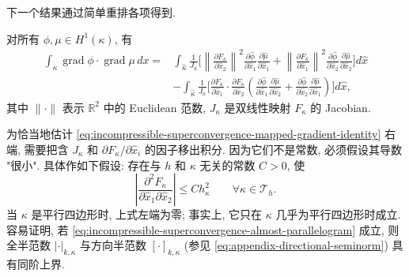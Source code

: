 下一个结果通过简单重排各项得到.

\begin{Lemma}\label{lem:incompressible-superconvergence-mapped-gradient-identity}
对所有 $\phi,\mu\in H^1(\kappa)$, 有
\begin{equation}\label{eq:incompressible-superconvergence-mapped-gradient-identity}
\begin{split}
\int_\kappa\operatorname{grad}\phi\cdot
\operatorname{grad}\mu\,dx
={}&\int_{\widehat\kappa}\frac1{J_\kappa}
\biggl[
\left\|\frac{\partial F_\kappa}{\partial\widehat x_2}\right\|^2
\frac{\partial\widehat\phi}{\partial\widehat x_1}
\frac{\partial\widehat\mu}{\partial\widehat x_1}
+\left\|\frac{\partial F_\kappa}{\partial\widehat x_1}\right\|^2
\frac{\partial\widehat\phi}{\partial\widehat x_2}
\frac{\partial\widehat\mu}{\partial\widehat x_2}
\biggr]d\widehat x\\
&-\int_{\widehat\kappa}\frac1{J_\kappa}
\biggl[
\frac{\partial F_\kappa}{\partial\widehat x_1}\cdot
\frac{\partial F_\kappa}{\partial\widehat x_2}
\left(
\frac{\partial\widehat\phi}{\partial\widehat x_1}
\frac{\partial\widehat\mu}{\partial\widehat x_2}
+\frac{\partial\widehat\phi}{\partial\widehat x_2}
\frac{\partial\widehat\mu}{\partial\widehat x_1}
\right)\biggr]d\widehat x,
\end{split}
\end{equation}
其中 $\|\cdot\|$ 表示 $\mathbb R^2$ 中的 Euclidean 范数,
$J_\kappa$ 是双线性映射 $F_\kappa$ 的 Jacobian.
\end{Lemma}

为恰当地估计
\eqref{eq:incompressible-superconvergence-mapped-gradient-identity}
右端, 需要把含 $J_\kappa$ 和
$\partial F_\kappa/\partial\widehat x_i$ 的因子移出积分.
因为它们不是常数, 必须假设其导数 "很小".
具体作如下假设: 存在与 $h$ 和 $\kappa$ 无关的常数 $C>0$, 使
\begin{equation}\label{eq:incompressible-superconvergence-almost-parallelogram}
\left|\frac{\partial^2F_\kappa}
{\partial\widehat x_1\partial\widehat x_2}\right|
\leq Ch_\kappa^2
\qquad\forall\kappa\in\mathcal T_h.
\end{equation}
当 $\kappa$ 是平行四边形时, 上式左端为零;
事实上, 它只在 $\kappa$ 几乎为平行四边形时成立.
容易证明, 若
\eqref{eq:incompressible-superconvergence-almost-parallelogram}
成立, 则全半范数 $|\cdot|_{k,\kappa}$
与方向半范数 $[\cdot]_{k,\kappa}$
(参见 \eqref{eq:appendix-directional-seminorm})
具有同阶上界.

